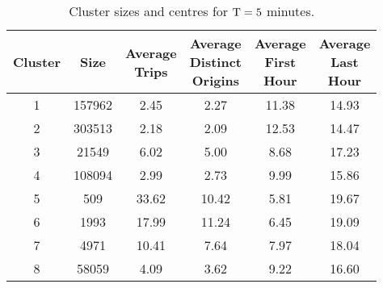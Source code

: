 \begin{table}[t]
\centering
\tabcolsep=0.15cm
\begin{tabular}{c c c c c c}
  \hline
 Cluster & Size & \thead{Average\\Trips} & \thead{Average\\Distinct\\Origins} & \thead{Average\\First\\Hour} & \thead{Average\\Last\\Hour} \\
  \hline
1 & 157962 & 2.45 & 2.27 & 11.38 & 14.93 \\
  2 & 303513 & 2.18 & 2.09 & 12.53 & 14.47 \\
  3 & 21549 & 6.02 & 5.00 & 8.68 & 17.23 \\
  4 & 108094 & 2.99 & 2.73 & 9.99 & 15.86 \\
  5 & 509 & 33.62 & 10.42 & 5.81 & 19.67 \\
  6 & 1993 & 17.99 & 11.24 & 6.45 & 19.09 \\
  7 & 4971 & 10.41 & 7.64 & 7.97 & 18.04 \\
  8 & 58059 & 4.09 & 3.62 & 9.22 & 16.60 \\
   \hline
\end{tabular}
\caption{Cluster sizes and centres for $\mathrm{T} = 5$ minutes.}
\label{t:kmeans_centers_300}
\end{table}
